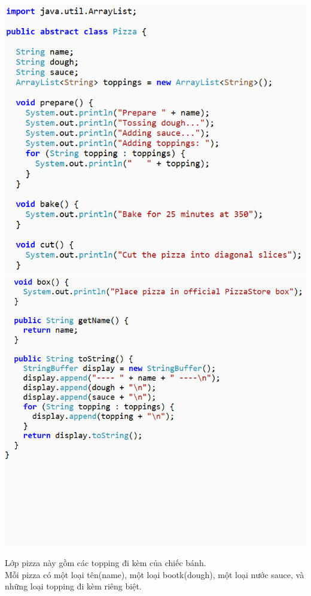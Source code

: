 \begin{multicols}{2}
	\includegraphics[width=1\columnwidth]{GALLEYS/images/chapter5/images4}
	\includegraphics[width=1\columnwidth]{GALLEYS/images/chapter5/images5}
\end{multicols}

Lớp pizza này gồm các topping đi kèm của chiếc bánh.\\
Mỗi pizza có một loại tên(name), một loại bootk(dough), một loại nước sauce, và những loại topping đi kèm riêng biệt.\\

